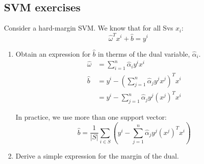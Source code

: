 \subsection{SVM exercises}

\begin{exercise}[breakable]{}{}
	Consider a hard-margin SVM. We know that for all Svs $x_i$:
	\begin{equation}
		\label{eq:svm:margin}
		\widehat\omega^T x^i + \widehat{b} = y^i
	\end{equation}

	\begin{enumerate}
		\item Obtain an expression for $\widehat{b}$ in therms of the
		      dual variable, $\widehat{\alpha}_i$.
		      \begin{align*}
			      \widehat\omega & = \sum_{i=1}^n \widehat\alpha_i y^i x^i                            \\
			      \widehat{b}    & = y^i - \left( \sum_{j=1}^n \widehat\alpha_j y^j x^j \right)^T x^i \\
			                     & = y^i - \sum_{j=1}^n \widehat\alpha_j y^j \left(x^j\right)^T x^i
		      \end{align*}

		      \begin{note}
			      In practice, we use more than one support vector:
			      \begin{equation*}
				      \widehat b = \frac{1}{\left|S\right|} \sum_{i \in S}
				      \left(
				      y^i - \sum_{j=1}^n \widehat\alpha_j y^j \left(x^j\right)^T x^i
				      \right)
			      \end{equation*}
		      \end{note}

		\item Derive a simple expression for the margin of the dual.


\end{enumerate}
\end{exercise}

